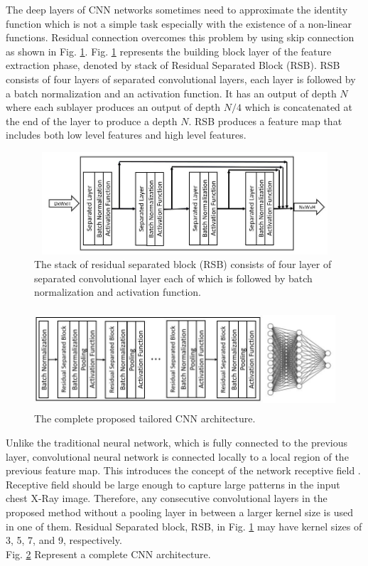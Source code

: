 The deep layers of CNN networks sometimes need to  approximate the identity function which is not a simple task especially  with the existence of a non-linear functions. Residual connection\cite{he2016deep} overcomes this problem by using skip connection as shown in Fig. \ref{fig4}.
Fig. \ref{fig4} represents the building block layer of the feature extraction phase, denoted by stack of Residual Separated Block  (RSB). RSB consists of four layers of separated convolutional layers, each layer is followed by a batch normalization and an activation function. It has an output of depth $N$ where each sublayer produces an output of depth $N/4$ which is concatenated at the end of the layer to produce a depth  $N$. RSB produces a feature map that includes both low level features and high level features.

\begin{figure}
\begin{center}
\includegraphics[height=38mm,width=14.0cm]{Figures/fig4.jpg}
\caption{The stack of residual separated block  (RSB) consists of four layer of separated convolutional layer each of which is followed by batch normalization and activation function.}
\label{fig4}
\end{center}
\end{figure}

\begin{figure}
    \begin{center}
    \includegraphics[height=37mm,width=14.0cm]{Figures/fig5.jpg}
    \caption{The complete proposed tailored CNN architecture.}
    \label{fig5}
    \end{center}
    \end{figure}
    
Unlike the traditional neural network, which is fully connected to the previous layer, convolutional neural network is connected locally to a local region of the previous feature map. This introduces the concept of the network receptive field \cite{luo2016understanding}. Receptive field should be large enough to capture large patterns in the input chest X-Ray image. Therefore, any consecutive convolutional layers in the proposed method without a pooling layer in between a larger kernel size is used in one of them. Residual Separated block, RSB, in Fig. \ref{fig4} may have kernel sizes of 3, 5, 7, and 9, respectively.\\
Fig. \ref{fig5} Represent a complete CNN architecture.

